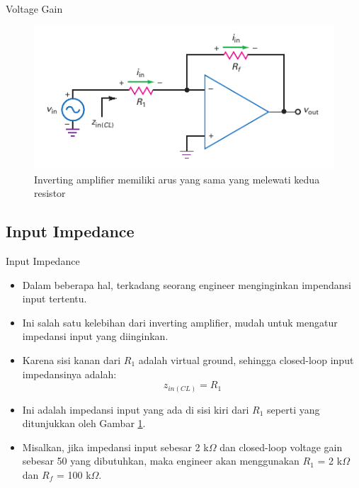 \begin{frame}{Voltage Gain}
	\begin{figure}
		\centering
		\includegraphics[height=0.4\textheight]{gambar/fig-16.14}
		\caption{Inverting amplifier memiliki arus yang sama yang melewati kedua resistor}
		\label{fig-16.14}
	\end{figure}
\end{frame}

\subsection{Input Impedance}

\begin{frame}{Input Impedance}
	\begin{itemize}
		\item Dalam beberapa hal, terkadang seorang engineer menginginkan impendansi input tertentu.
		\item Ini salah satu kelebihan dari inverting amplifier, mudah untuk mengatur impedansi input yang diinginkan.
		\item Karena sisi kanan dari $ R_1 $ adalah virtual ground, sehingga closed-loop input impedansinya adalah:\\

		\begin{equation}\label{pers.16.04}
			z_{in(CL)} = R_1
		\end{equation}

		\item Ini adalah impedansi input yang ada di sisi kiri dari $ R_1 $ seperti yang ditunjukkan oleh Gambar \ref{fig-16.14}.
		\item Misalkan, jika impedansi input sebesar 2 k$\Omega$ dan closed-loop voltage gain sebesar 50 yang dibutuhkan, maka engineer akan menggunakan $ R_1 $ = 2 k$\Omega$ dan $ R_f $ = 100 k$\Omega$.
	\end{itemize}
\end{frame}

